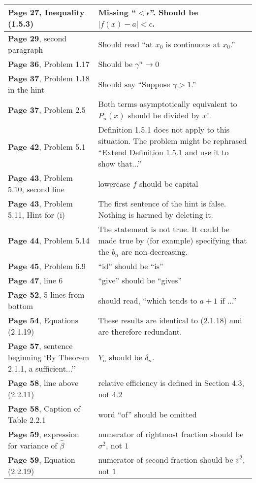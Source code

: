 \documentclass[10pt, a4paper]{article}
\begin{document}
\begin{longtable}{|R{.40\textwidth}|R{.55\textwidth}|}
\textbf{Page 27}, Inequality (1.5.3) & Missing ``$< \epsilon$''. Should be $|f(x)-a| < \epsilon$. \\ \hline
\textbf{Page 29}, second paragraph & Should read ``at $x_0$ is continuous at $x_0$.'' \\ \hline
\textbf{Page 36}, Problem 1.17 & Should be $\gamma^n\to 0$ \\ \hline
\textbf{Page 37}, Problem 1.18 in the hint & Should say ``Suppose $\gamma > 1$.'' \\ \hline
\textbf{Page 37}, Problem 2.5 & Both terms asymptotically equivalent to $P_n(x)$ should be divided by $x!$. \\ \hline
\textbf{Page 42}, Problem 5.1 & Definition 1.5.1 does not apply to this situation. The problem might be rephrased ``Extend Definition 1.5.1 and use it to show that...'' \\ \hline
\textbf{Page 43}, Problem 5.10, second line & lowercase $f$ should be capital \\ \hline
\textbf{Page 43}, Problem 5.11, Hint for (i) & The first sentence of the hint is false. Nothing is harmed by deleting it. \\ \hline
\textbf{Page 44}, Problem 5.14 & The statement is not true. It could be made true by (for example) specifying that the ${b_n}$ are non-decreasing. \\ \hline
\textbf{Page 45}, Problem 6.9 & ``id'' should be ``is'' \\ \hline
\textbf{Page 47}, line 6 & ``give'' should be ``gives'' \\ \hline
\textbf{Page 52}, 5 lines from bottom & should read, ``which tends to $a+1$ if ...'' \\ \hline
\textbf{Page 54}, Equations (2.1.19) & These results are identical to (2.1.18) and are therefore redundant. \\ \hline
\textbf{Page 57}, sentence beginning `By Theorem 2.1.1, a sufficient...'' & $Y_n$ should be $\delta_n$. \\ \hline
\textbf{Page 58}, line above (2.2.11) & relative efficiency is defined in Section 4.3, not 4.2 \\ \hline
\textbf{Page 58}, Caption of Table 2.2.1 & word ``of'' should be omitted \\ \hline
\textbf{Page 59}, expression for variance of $\widehat{\beta}$ & numerator of rightmost fraction should be $\sigma^2$, not $1$ \\ \hline
\textbf{Page 59}, Equation (2.2.19) & numerator of second fraction should be $\overline{v}^2$, not $1$ \\ \hline

\end{longtable}
\end{document}
